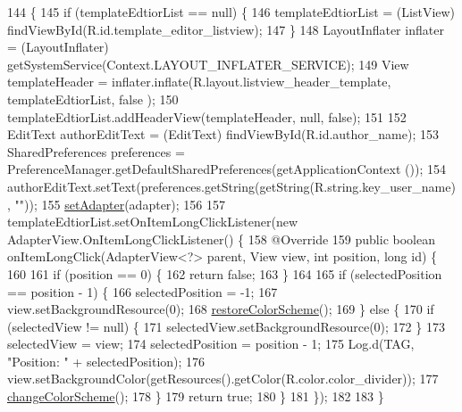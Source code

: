 \begin{DoxyCode}
144                                                                \{
145         \textcolor{keywordflow}{if} (templateEdtiorList == null) \{
146             templateEdtiorList = (ListView) findViewById(R.id.template\_editor\_listview);
147         \}
148         LayoutInflater inflater = (LayoutInflater) getSystemService(Context.LAYOUT\_INFLATER\_SERVICE);
149         View templateHeader = inflater.inflate(R.layout.listview\_header\_template, templateEdtiorList, \textcolor{keyword}{false}
      );
150         templateEdtiorList.addHeaderView(templateHeader, null, \textcolor{keyword}{false});
151 
152         EditText authorEditText = (EditText) findViewById(R.id.author\_name);
153         SharedPreferences preferences = PreferenceManager.getDefaultSharedPreferences(getApplicationContext
      ());
154         authorEditText.setText(preferences.getString(getString(R.string.key\_user\_name), \textcolor{stringliteral}{""}));
155         \hyperlink{classorg_1_1buildmlearn_1_1toolkit_1_1activity_1_1TemplateEditor_a5c1e35aa985ed2199d9795ad1ab03e0d}{setAdapter}(adapter);
156 
157         templateEdtiorList.setOnItemLongClickListener(\textcolor{keyword}{new} AdapterView.OnItemLongClickListener() \{
158             @Override
159             \textcolor{keyword}{public} \textcolor{keywordtype}{boolean} onItemLongClick(AdapterView<?> parent, View view, \textcolor{keywordtype}{int} position, \textcolor{keywordtype}{long} \textcolor{keywordtype}{id}) \{
160 
161                 \textcolor{keywordflow}{if} (position == 0) \{
162                     \textcolor{keywordflow}{return} \textcolor{keyword}{false};
163                 \}
164 
165                 \textcolor{keywordflow}{if} (selectedPosition == position - 1) \{
166                     selectedPosition = -1;
167                     view.setBackgroundResource(0);
168                     \hyperlink{classorg_1_1buildmlearn_1_1toolkit_1_1activity_1_1TemplateEditor_a596abe1f201578b28de1e3491b4f8cd6}{restoreColorScheme}();
169                 \} \textcolor{keywordflow}{else} \{
170                     \textcolor{keywordflow}{if} (selectedView != null) \{
171                         selectedView.setBackgroundResource(0);
172                     \}
173                     selectedView = view;
174                     selectedPosition = position - 1;
175                     Log.d(TAG, \textcolor{stringliteral}{"Position: "} + selectedPosition);
176                     view.setBackgroundColor(getResources().getColor(R.color.color\_divider));
177                     \hyperlink{classorg_1_1buildmlearn_1_1toolkit_1_1activity_1_1TemplateEditor_a579696858455696ea2bac7bea2dccbd0}{changeColorScheme}();
178                 \}
179                 \textcolor{keywordflow}{return} \textcolor{keyword}{true};
180             \}
181         \});
182 
183     \}
\end{DoxyCode}
